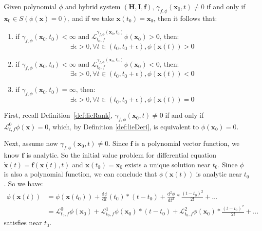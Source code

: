 \documentclass{jssc}
\begin{document}
\begin{theorem}
\label{thm:lieDeri}
Given polynomial $\phi$ and hybrid system $(\boldsymbol{H}, \boldsymbol{I}, \boldsymbol{f})$, $\gamma_{f, \phi}(\boldsymbol{x}_0, t) \neq 0$ if and only if $\boldsymbol{x}_0 \in S(\phi(\boldsymbol{x}) = 0)$,  and if we take $\boldsymbol{x}(t_0) = \boldsymbol{x}_0$, then it follows that:
\begin{enumerate}
	\item if $\gamma_{f, \phi}(\boldsymbol{x}_0, t_0) < \infty$ and $\mathcal{L}_{t_0, f}^{\gamma_{f, \phi}(\boldsymbol{x}_0, t_0)} \phi (\boldsymbol{x}_0) > 0$, then:
		\begin{equation*}
			\exists \epsilon > 0, \forall t \in (t_0, t_0 + \epsilon),\phi (\boldsymbol{x}(t)) > 0
		\end{equation*}
	\item if $\gamma_{f, \phi}(\boldsymbol{x}_0, t_0) < \infty$ and $\mathcal{L}_{t_0, f}^{\gamma_{f, \phi}(\boldsymbol{x}_0, t_0)} \phi (\boldsymbol{x}_0) < 0$, then:
		\begin{equation*}
			\exists \epsilon > 0, \forall t \in (t_0, t_0 + \epsilon),\phi (\boldsymbol{x}(t)) < 0
		\end{equation*}
	\item if $\gamma_{f, \phi}(\boldsymbol{x}_0, t_0) = \infty$, then:
		\begin{equation*}
			\exists \epsilon > 0, \forall t \in (t_0, t_0 + \epsilon),\phi (\boldsymbol{x}(t)) = 0
		\end{equation*}
\end{enumerate}
\end{theorem}

\proof
First, recall Definition~\ref{def:lieRank}, $\gamma_{f, \phi}(\boldsymbol{x}_0, t) \neq 0$ if and only if $\mathcal{L}_{t, f}^0 \phi (\boldsymbol{x}) = 0$, which, by Definition \ref{def:lieDeri}, is equivalent to $\phi(\boldsymbol{x}_0) = 0$.

Next, assume now $\gamma_{f, \phi}(\boldsymbol{x}_0, t) \neq 0$. Since $\boldsymbol{f}$ is a polynomial vector function, we know $\boldsymbol{f}$ is analytic. So the initial value problem for differential equation $\dot{\boldsymbol{x}}(t) = \boldsymbol{f}(\boldsymbol{x}(t),t)$ and $\boldsymbol{x}(t_0) = \boldsymbol{x}_0$ exists a unique solution near $t_0$\cite{tenenbaum1963ordinary}. Since $\phi$ is also a polynomial function, we can conclude that $\phi(\boldsymbol{x}(t))$ is analytic near $t_0$. So we have:
	\begin{equation*}
		\begin{split}
		\phi(\boldsymbol{x}(t)) &= \phi(\boldsymbol{x}(t_0)) + \frac{\mathrm{d} \phi}{\mathrm{d}t}(t_0) * (t-t_0) + \frac{\mathrm{d}^2 \phi}{\mathrm{d}t^2} * \frac{(t-t_0)^2}{2!} + \dots \\
							&= {\mathcal{L}_{t_0, f}^0 \phi(\boldsymbol{x}_0)} + \mathcal{L}_{t_0, f}^1 \phi(\boldsymbol{x}_0) * (t-t_0) + \mathcal{L}_{t_0, f}^2 \phi(\boldsymbol{x}_0) * \frac{(t-t_0)^2}{2!} + \dots
		\end{split}
	\end{equation*}
satisfies near $t_0$.
\end{document}
